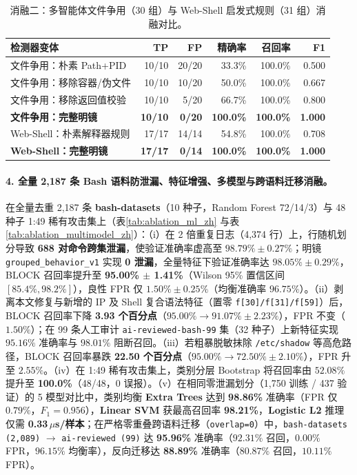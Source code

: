 \documentclass[UTF8,a4paper,zihao=-4,twocolumn]{ctexart}
\newcommand{\code}[1]{\texttt{\small #1}}
\begin{document}
\begin{table}[t]
\centering
\scriptsize
\setlength{\tabcolsep}{2.4pt}
\caption{消融二：多智能体文件争用（30 组）与 Web-Shell 启发式规则（31 组）消融对比。}
\label{tab:ablation_sem_zh}
\begin{tabular}{@{}lrrrrr@{}}
\toprule
\textbf{检测器变体} & \textbf{TP} & \textbf{FP} & \textbf{精确率} & \textbf{召回率} & \textbf{F1} \\
\midrule
文件争用：朴素 Path+PID     & 10/10 & 20/20 & 33.3\% & 100.0\% & 0.500 \\
文件争用：移除容器/伪文件   & 10/10 & 10/20 & 50.0\% & 100.0\% & 0.667 \\
文件争用：移除返回值校验    & 10/10 & 5/20  & 66.7\% & 100.0\% & 0.800 \\
\textbf{文件争用：完整明镜} & \textbf{10/10} & \textbf{0/20} & \textbf{100.0\%} & \textbf{100.0\%} & \textbf{1.000} \\
\midrule
Web-Shell：朴素解释器规则   & 17/17 & 14/14 & 54.8\% & 100.0\% & 0.708 \\
\textbf{Web-Shell：完整明镜}& \textbf{17/17} & \textbf{0/14} & \textbf{100.0\%} & \textbf{100.0\%} & \textbf{1.000} \\
\bottomrule
\end{tabular}
\end{table}

\paragraph{4. 全量 2,187 条 Bash 语料防泄漏、特征增强、多模型与跨语料迁移消融。}
在全量去重 2,187 条 \textbf{bash-datasets}（10 种子，Random Forest 72/14/3）与 48 种子 1:49 稀有攻击集上（表\ref{tab:ablation_ml_zh} 与表\ref{tab:ablation_multimodel_zh}）：（i）在 2 倍重复日志（4,374 行）上，行随机划分导致 \textbf{688 对命令跨集泄漏}，使验证准确率虚高至 $98.79\% \pm 0.27\%$；明镜 \code{grouped\_behavior\_v1} 实现 \textbf{0 泄漏}，全量特征下验证准确率达 $98.05\% \pm 0.29\%$，BLOCK 召回率提升至 \textbf{95.00\% $\pm$ 1.41\%}（Wilson 95\% 置信区间 $[85.4\%, 98.2\%]$），良性 FPR 仅 $1.50\% \pm 0.25\%$（均衡准确率 $96.75\%$）。（ii）剥离本文修复与新增的 IP 及 Shell 复合语法特征（置零 \code{f[30]/f[31]/f[59]}）后，BLOCK 召回率下降 \textbf{3.93 个百分点}（$95.00\% \to 91.07\% \pm 2.23\%$），FPR 不变（$1.50\%$）；在 99 条人工审计 \code{ai-reviewed-bash-99} 集（32 种子）上新特征实现 $95.16\%$ 准确率与 $98.01\%$ 阻断召回。（iii）若粗暴脱敏抹除 \code{/etc/shadow} 等高危路径，BLOCK 召回率暴跌 \textbf{22.50 个百分点}（$95.00\% \to 72.50\% \pm 2.10\%$），FPR 升至 $2.55\%$。（iv）在 1:49 稀有攻击集上，类别分层 Bootstrap 将召回率由 $52.08\%$ 提升至 \textbf{100.0\%}（48/48，0 误报）。（v）在相同零泄漏划分（1,750 训练 / 437 验证）的 5 模型对比中，类别均衡 \textbf{Extra Trees} 达到 \textbf{98.86\%} 准确率（FPR 仅 $0.79\%$，$F_1=0.956$），\textbf{Linear SVM} 获最高召回率 \textbf{98.21\%}，\textbf{Logistic L2} 推理仅需 \textbf{0.33\,$\mu$s/样本}；在严格零重叠跨语料迁移（\code{overlap=0}）中，\code{bash-datasets (2,089)} $\to$ \code{ai-reviewed (99)} 达 \textbf{95.96\%} 准确率（$92.31\%$ 召回，$0.00\%$ FPR，$96.15\%$ 均衡率），反向迁移达 \textbf{88.89\%} 准确率（$80.87\%$ 召回，$10.11\%$ FPR）。
\end{document}
